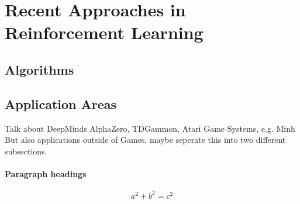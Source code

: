     \section{Recent Approaches in Reinforcement Learning}
    \label{sec:recent}
    \subsection{Algorithms}
    \label{sec:algo}
    \subsection{Application Areas}
    \label{sec:games}
    Talk about DeepMinds AlphaZero, TDGammon, Atari Game Systems, e.g. Minh
    But also applications outside of Games, maybe seperate this into two different subsections.
    \paragraph{Paragraph headings}
    \begin{equation}
        a^2+b^2=c^2
    \end{equation}

